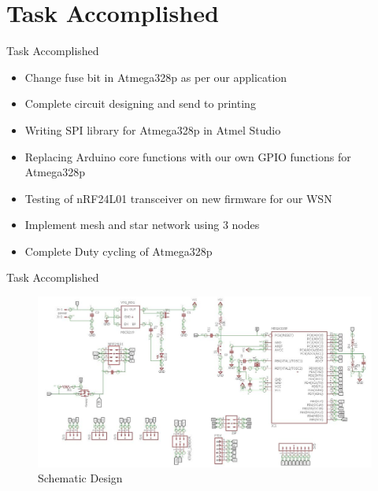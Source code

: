 \documentclass[10pt, a4paper]{beamer}
\begin{document}
\section{Task Accomplished}
\begin{frame}{Task Accomplished}
	\begin{itemize}
		\item  Change fuse bit in Atmega328p as per our application
        \item Complete circuit designing and send to printing
         \item Writing SPI library for Atmega328p in Atmel Studio
    	 \item Replacing Arduino core functions with our own GPIO functions for Atmega328p
         \item Testing of nRF24L01 transceiver on new firmware for our WSN 
     	 \item Implement mesh and star network using 3 nodes
         \item Complete Duty cycling of Atmega328p
 \end{itemize}

\end{frame}


\begin{frame}{Task Accomplished}
\begin{figure}
\begin{center}
\includegraphics[width=1\textwidth]{eagle_sch_snap.JPG}
\caption{Schematic Design}
\end{center}
\end{figure}
\end {frame}
\end{document}
